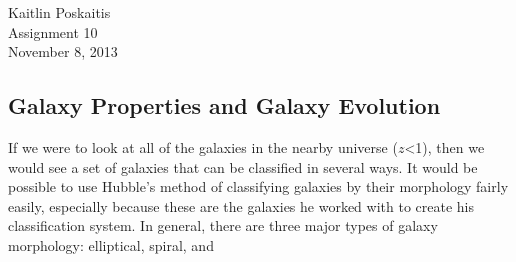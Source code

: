 \documentclass[12pt]{article}
\begin{document}
\noindent Kaitlin Poskaitis\\
Assignment 10\\
November 8, 2013
\begin{center}
    \section*{\bf Galaxy Properties and Galaxy Evolution}
\end{center}

If we were to look at all of the galaxies in the nearby universe ($z$<1), then we
would see a set of galaxies that can be classified in several ways.  It would be
possible to use Hubble's method of classifying galaxies by their morphology
fairly easily, especially because these are the galaxies he worked with to
create his classification system.  In general, there are three major types of
galaxy morphology: elliptical, spiral, and 
\end{document}
